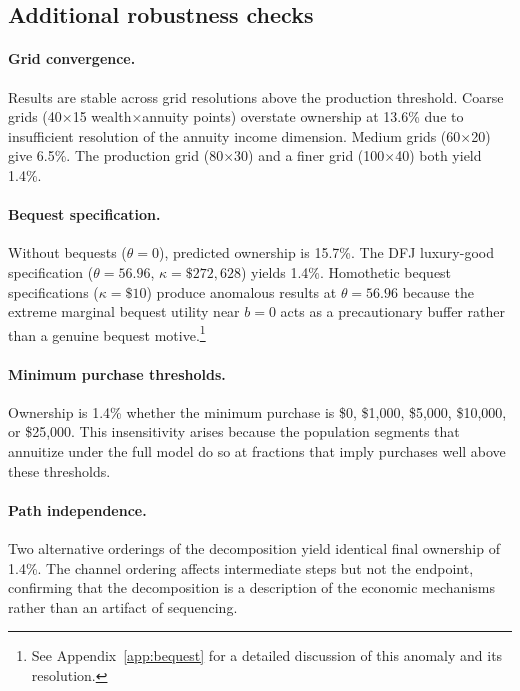 \documentclass[12pt]{article}
\begin{document}
\subsection{Additional robustness checks}

\paragraph{Grid convergence.} Results are stable across grid resolutions above the production threshold. Coarse grids (40$\times$15 wealth$\times$annuity points) overstate ownership at 13.6\% due to insufficient resolution of the annuity income dimension. Medium grids (60$\times$20) give 6.5\%. The production grid (80$\times$30) and a finer grid (100$\times$40) both yield 1.4\%.

\paragraph{Bequest specification.} Without bequests ($\theta = 0$), predicted ownership is 15.7\%. The DFJ luxury-good specification ($\theta = 56.96$, $\kappa = \$272{,}628$) yields 1.4\%. Homothetic bequest specifications ($\kappa = \$10$) produce anomalous results at $\theta = 56.96$ because the extreme marginal bequest utility near $b = 0$ acts as a precautionary buffer rather than a genuine bequest motive.\footnote{See Appendix~\ref{app:bequest} for a detailed discussion of this anomaly and its resolution.}

\paragraph{Minimum purchase thresholds.} Ownership is 1.4\% whether the minimum purchase is \$0, \$1,000, \$5,000, \$10,000, or \$25,000. This insensitivity arises because the population segments that annuitize under the full model do so at fractions that imply purchases well above these thresholds.

\paragraph{Path independence.} Two alternative orderings of the decomposition yield identical final ownership of 1.4\%. The channel ordering affects intermediate steps but not the endpoint, confirming that the decomposition is a description of the economic mechanisms rather than an artifact of sequencing.


\end{document}
